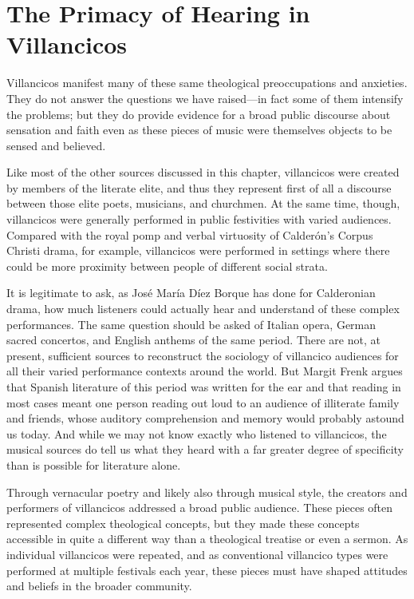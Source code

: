 \section{The Primacy of Hearing in Villancicos}

Villancicos manifest many of these same theological preoccupations and 
anxieties.
They do not answer the questions we have raised---in fact some of them 
intensify the problems; but they do provide evidence for a broad public 
discourse about sensation and faith even as these pieces of music were 
themselves objects to be sensed and believed.

Like most of the other sources discussed in this chapter, villancicos were 
created by members of the literate elite, and thus they represent first of all 
a discourse between those elite poets, musicians, and churchmen.
At the same time, though, villancicos were generally performed in public 
festivities with varied audiences.
Compared with the royal pomp and verbal virtuosity of Calderón's Corpus Christi 
drama, for example, villancicos were performed in settings where there could be 
more proximity between people of different social strata.

It is legitimate to ask, as José María Díez Borque has done for Calderonian 
drama, how much listeners could actually hear and understand of these complex 
performances.%
    \Autocite{DiezBorque:Publico}
The same question should be asked of Italian opera, German sacred concertos, 
and English anthems of the same period.
There are not, at present, sufficient sources to reconstruct the sociology of 
villancico audiences for all their varied performance contexts around the world.
But Margit Frenk argues that Spanish literature of this period was written for 
the ear and that reading in most cases meant one person reading out loud to an 
audience of illiterate family and friends, whose auditory comprehension and 
memory would probably astound us today.%
    \Autocite{Frenk:Voz}
And while we may not know exactly who listened to villancicos, the musical 
sources do tell us what they heard with a far greater degree of specificity 
than is possible for literature alone.

Through vernacular poetry and likely also through musical style, the creators 
and performers of villancicos addressed a broad public audience.
These pieces often represented complex theological concepts, but they made 
these concepts accessible in quite a different way than a theological treatise 
or even a sermon.
As individual villancicos were repeated, and as conventional villancico types 
were performed at multiple festivals each year, these pieces must have shaped 
attitudes and beliefs in the broader community.


